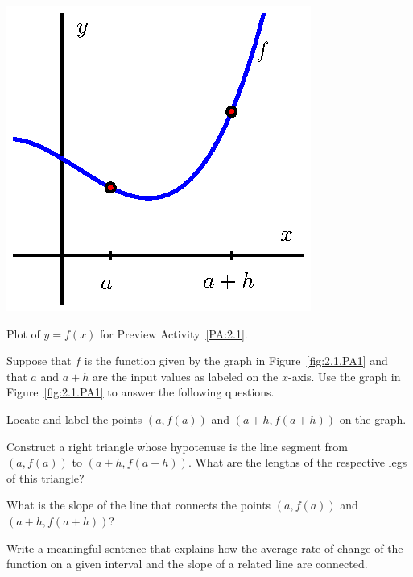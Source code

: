 \begin{marginfigure}
\includegraphics{figures/1_3_PA1.eps}
\caption{Plot of $y = f(x)$ for Preview Activity~\ref{PA:2.1}.} \label{fig:2.1.PA1}
\end{marginfigure}

\begin{pa} \label{PA:2.1}
Suppose that $f$ is the function given by the graph in Figure~\ref{fig:2.1.PA1} and that $a$ and $a+h$ are the input values as labeled on the $x$-axis.  Use the graph in Figure~\ref{fig:2.1.PA1} to answer the following questions.

\ba
	\item Locate and label the points $(a,f(a))$ and $(a+h, f(a+h))$ on the graph.
	\item Construct a right triangle whose hypotenuse is the line segment from $(a,f(a))$ to $(a+h,f(a+h))$.  What are the lengths of the respective legs of this triangle?
	\item What is the slope of the line that connects the points $(a,f(a))$ and $(a+h, f(a+h))$?
	\item Write a meaningful sentence that explains how the average rate of change of the function on a given interval and the slope of a related line are connected.
\ea
\end{pa} \afterpa